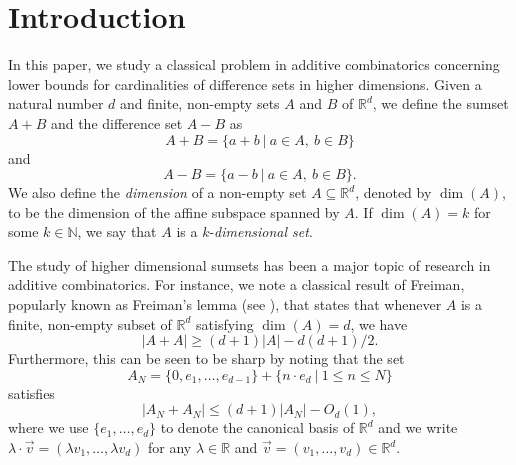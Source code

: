\section{Introduction}

In this paper, we study a classical problem in additive combinatorics concerning lower bounds for cardinalities of difference sets in higher dimensions. Given a natural number $d$ and finite, non-empty sets $A$ and $B$ of $\mathbb{R}^d$, we define the sumset $A+B$ and the difference set $A-B$ as
\[ A+ B = \{ a + b \ | \ a \in A, \ b \in B \}\]
and
\[A- B = \{ a- b \ | \ a \in A, \ b \in B\}. \]
We also define the \emph{dimension} of a non-empty set $A \subseteq \mathbb{R}^d$, denoted by $\dim(A)$, to be the dimension of the affine subspace spanned by $A$. If $\dim(A) = k$ for some $k \in \mathbb{N}$, we say that $A$ is a $k$-\emph{dimensional set}. 
\par

The study of higher dimensional sumsets has been a major topic of research in additive combinatorics. For instance, we note a classical result of Freiman, popularly known as Freiman's lemma (see \cite[Lemma $5.13$]{TV2006}), that states that whenever $A$ is a finite, non-empty subset of $\mathbb{R}^d$ satisfying $\dim(A) =d$, we have
\begin{equation} \label{i1frl}
 |A+A| \geq (d+1)|A| - d(d+1)/2. 
 \end{equation}
Furthermore, this can be seen to be sharp by noting that the set
\begin{equation} \label{trin1}
 A_N = \{0, e_1, \dots, e_{d-1}\} + \{n \cdot e_d \ | \ 1  \leq n \leq N\}
 \end{equation}
satisfies 
\[ |A_N + A_N| \leq (d+1)|A_N| - O_{d}(1), \]
where we use $\{e_1, \dots, e_d\}$ to denote the canonical basis of $\mathbb{R}^d$ and we write $\lambda \cdot \vec{v}= (\lambda v_1, \dots, \lambda v_d)$ for any $\lambda \in \mathbb{R}$ and $\vec{v} = (v_1, \dots, v_d) \in \mathbb{R}^d$. 
\par

